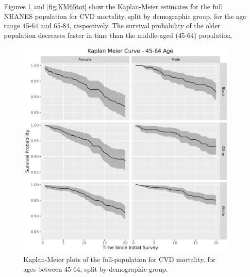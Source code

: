 \documentclass[
]{article}
\begin{document}
Figures \ref{fig:KM45tot} and \ref{fig:KM65tot} show the Kaplan-Meier estimates for the full NHANES population for CVD mortality, split by demographic group, for the age range 45-64 and 65-84, respectively. The survival probability of the older population decreases faster in time than the middle-aged (45-64) population.

\begin{figure}
\hypertarget{fig:KM45tot}{%
\centering
\includegraphics{./Rmarkdown_Plots/SurvProbKM_45-64.png}
\caption{Kaplan-Meier plots of the full-population for CVD mortality, for ages between 45-64, split by demographic group.}\label{fig:KM45tot}
}
\end{figure}
\end{document}
